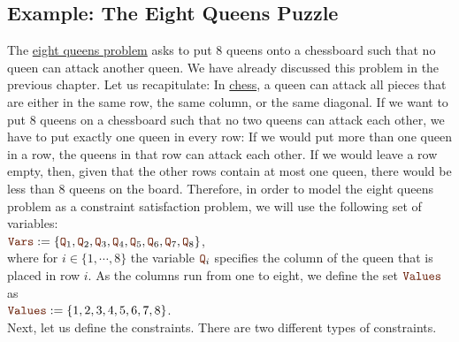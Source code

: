 \subsection{Example: The Eight Queens Puzzle}
The \href{https://en.wikipedia.org/wiki/Eight_queens_puzzle}{eight queens problem} asks to put 8 queens onto a
chessboard such that no queen can attack another queen.  We have already discussed this problem in the previous
chapter.  Let us recapitulate: In \href{https://en.wikipedia.org/wiki/Chess}{chess},
a queen can attack all pieces that are either in the same row, the same column, or the same diagonal.  If we
want to put 8 queens on a chessboard such that no two queens can attack each other, we have to put exactly one
queen in every row:  If we would put more than one queen in a row, the queens in that row can attack each other.
If we would leave a row empty, then, given that the other rows contain at most one queen, there would be less
than 8 queens on the board.  Therefore, in order to model the eight queens problem as a constraint satisfaction
problem, we will use the following set of variables:
\\[0.2cm]
\hspace*{1.3cm}
$\mytt{Vars} := \{ \mytt{Q}_1, \mytt{Q}_2, \mytt{Q}_3, \mytt{Q}_4, \mytt{Q}_5, \mytt{Q}_6, \mytt{Q}_7,\mytt{Q}_8 \}$,
\\[0.2cm]
where for $i \in \{1,\cdots,8\}$ the variable $\mytt{Q}_i$ specifies the column of the queen that is placed in
row $i$.   As the columns run from one to eight, we define the set $\mytt{Values}$ as
\\[0.2cm]
\hspace*{1.3cm}
$\mytt{Values} := \{1,2,3,4,5,6,7,8\}$.
\\[0.2cm]
Next, let us define the constraints.  There are two different types of constraints.
